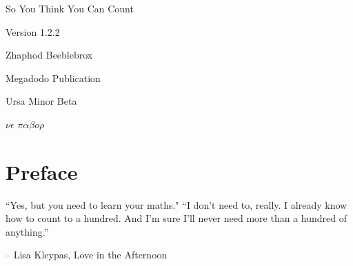 \documentclass{book}
\title{\thetitle}
\author{Zhaphod Beeblebrox}
\theoremstyle{plain}
\newcommand{\thetitle}{So You Think You Can Count}
\newcommand{\theversion}{1.2.2}
\begin{document}

%
%
%
%
%
\newcommand{\blankpage}{\thispagestyle{empty} \quad \newpage}


\pagebreak
\thispagestyle{empty}

\begin{flushright}
\vspace*{2.0in}

\begin{spacing}{3}
{\huge \thetitle}
\end{spacing}

\vspace{0.25in}

Version \theversion

\vspace{1in}


{\Large
Zhaphod Beeblebrox\\
}


\vspace{0.5in}

{\Large Megadodo Publication}

{\small Ursa Minor Beta}

\vfill

\end{flushright}

\pagebreak
\begin{center}
\vspace*{2.0in}

{\Huge $\nu\epsilon$ $\pi\alpha\beta o \rho$}
\end{center}
\frontmatter
\chapter{Preface}
\epigraph{``Yes, but you need to learn your maths."\newline\newline
``I don't need to, really. I already know how to count to a hundred. And I'm sure I'll never need more than a hundred of anything.”}{-- \textup{Lisa Kleypas}, Love in the Afternoon}
\end{document}
